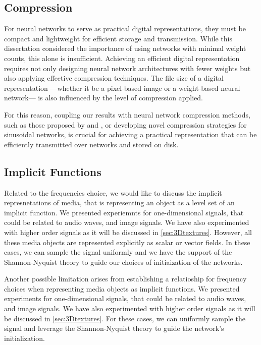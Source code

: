 \subsection{Compression}

For neural networks to serve as practical digital representations, they must be compact and lightweight for efficient storage and transmission. While this dissertation considered the importance of using networks with minimal weight counts, this alone is insufficient. Achieving an efficient digital representation requires not only designing neural network architectures with fewer weights but also applying effective compression techniques. The file size of a digital representation —whether it be a pixel-based image or a weight-based neural network— is also influenced by the level of compression applied.

For this reason, coupling our results with neural network compression methods, such as those proposed by \citet{dupont2021coin} and \citet{dupont2022coinpp}, or developing novel compression strategies for sinusoidal networks, is crucial for achieving a practical representation that can be efficiently transmitted over networks and stored on disk.


\subsection{Implicit Functions}

Related to the frequencies choice, we would like to discuss the implicit represnetations of media, that is representing an object as a level set of an implicit function. We presented experiemnts for one-dimensional signals, that could be related to audio waves, and image signals. We have also experimented with higher order signals as it will be discussed in \ref{sec:3Dtextures}. However, all these media objects are represented explicitly as scalar or vector fields. In these cases, we can sample the signal uniformly and we have the support of the Shannon-Nyquist theory to guide our choices of initiaization of the networks.

Another possible limitation arises from establishing a relatioship for frequency choices when representing media objects as implicit functions. We presented experiments for one-dimensional signals, that could be related to audio waves, and image signals. We have also experimented with higher order signals as it will be discussed in \ref{sec:3Dtextures}. For these cases, we can uniformly sample the signal and leverage the Shannon-Nyquist theory to guide the network's initialization.

